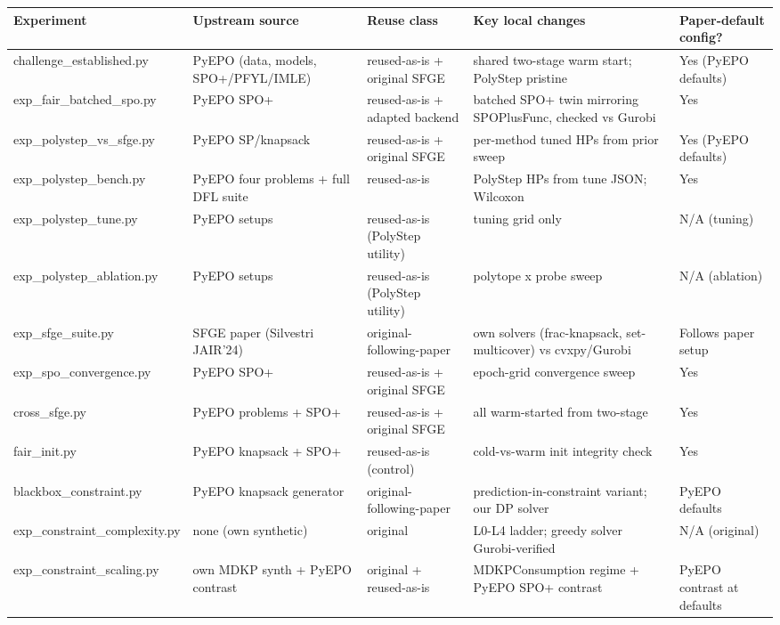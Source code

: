 \documentclass[10pt]{article}
\begin{document}
{\footnotesize\begin{longtable}{p{}p{}p{}p{}p{}}
\toprule
\textbf{Experiment} & \textbf{Upstream source} & \textbf{Reuse class} & \textbf{Key local changes} & \textbf{Paper-default config?} \\ \midrule \endhead
challenge\_established.py & PyEPO (data, models, SPO+/PFYL/IMLE) & reused-as-is + original SFGE & shared two-stage warm start; PolyStep pristine & Yes (PyEPO defaults) \\
exp\_fair\_batched\_spo.py & PyEPO SPO+ & reused-as-is + adapted backend & batched SPO+ twin mirroring SPOPlusFunc, checked vs Gurobi & Yes \\
exp\_polystep\_vs\_sfge.py & PyEPO SP/knapsack & reused-as-is + original SFGE & per-method tuned HPs from prior sweep & Yes (PyEPO defaults) \\
exp\_polystep\_bench.py & PyEPO four problems + full DFL suite & reused-as-is & PolyStep HPs from tune JSON; Wilcoxon & Yes \\
exp\_polystep\_tune.py & PyEPO setups & reused-as-is (PolyStep utility) & tuning grid only & N/A (tuning) \\
exp\_polystep\_ablation.py & PyEPO setups & reused-as-is (PolyStep utility) & polytope x probe sweep & N/A (ablation) \\
exp\_sfge\_suite.py & SFGE paper (Silvestri JAIR'24) & original-following-paper & own solvers (frac-knapsack, set-multicover) vs cvxpy/Gurobi & Follows paper setup \\
exp\_spo\_convergence.py & PyEPO SPO+ & reused-as-is + original SFGE & epoch-grid convergence sweep & Yes \\
cross\_sfge.py & PyEPO problems + SPO+ & reused-as-is + original SFGE & all warm-started from two-stage & Yes \\
fair\_init.py & PyEPO knapsack + SPO+ & reused-as-is (control) & cold-vs-warm init integrity check & Yes \\
blackbox\_constraint.py & PyEPO knapsack generator & original-following-paper & prediction-in-constraint variant; our DP solver & PyEPO defaults \\
exp\_constraint\_complexity.py & none (own synthetic) & original & L0-L4 ladder; greedy solver Gurobi-verified & N/A (original) \\
exp\_constraint\_scaling.py & own MDKP synth + PyEPO contrast & original + reused-as-is & MDKPConsumption regime + PyEPO SPO+ contrast & PyEPO contrast at defaults \\

\end{longtable}}
\end{document}
